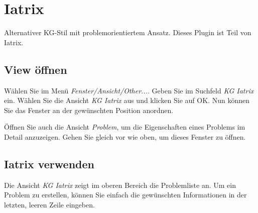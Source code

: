 
\section{Iatrix}\label{Iatrix}
Alternativer KG-Stil mit problemorientiertem Ansatz. Dieses Plugin ist Teil von Iatrix.

\subsection{View öffnen}

Wählen Sie im Menü \textit{Fenster/Ansicht/Other...}. Geben Sie im Suchfeld
\textit{KG Iatrix} ein. Wählen Sie die Ansicht \textit{KG Iatrix} aus
und klicken Sie auf OK. Nun können Sie das Fenster an der gewünschten Position
anordnen.

Öffnen Sie auch die Ansicht \textit{Problem}, um die Eigenschaften eines
Problems im Detail anzuzeigen. Gehen Sie gleich vor wie oben, um dieses Fenster
zu öffnen.

\subsection{Iatrix verwenden}

Die Ansicht \textit{KG Iatrix} zeigt im oberen Bereich die Problemliste an.
Um ein Problem zu erstellen, können Sie einfach die gewünschten Informationen
in der letzten, leeren Zeile eingeben.


